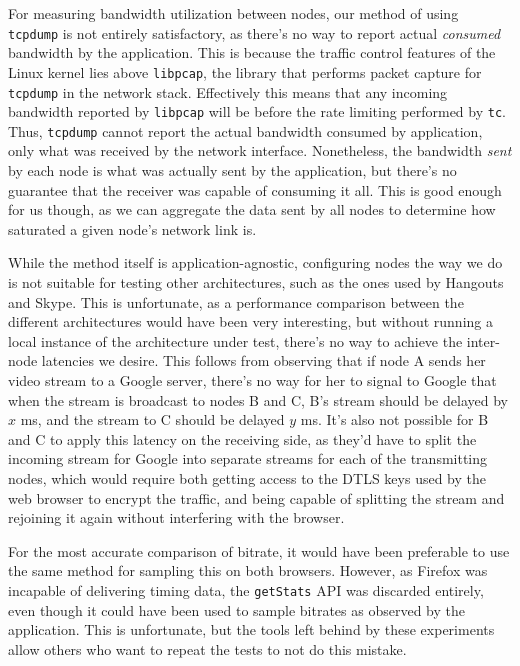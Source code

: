 For measuring bandwidth utilization between nodes, our method of using \texttt{tcpdump} is not entirely satisfactory, as there's no way to report actual \emph{consumed} bandwidth by the application. This is because the traffic control features of the Linux kernel lies above \texttt{libpcap}, the library that performs packet capture for \texttt{tcpdump} in the network stack. Effectively this means that any incoming bandwidth reported by \texttt{libpcap} will be before the rate limiting performed by \texttt{tc}. Thus, \texttt{tcpdump} cannot report the actual bandwidth consumed by application, only what was received by the network interface. Nonetheless, the bandwidth \emph{sent} by each node is what was actually sent by the application, but there's no guarantee that the receiver was capable of consuming it all. This is good enough for us though, as we can aggregate the data sent by all nodes to determine how saturated a given node's network link is.

While the method itself is application-agnostic, configuring nodes the way we do is not suitable for testing other architectures, such as the ones used by Hangouts and Skype. This is unfortunate, as a performance comparison between the different architectures would have been very interesting, but without running a local instance of the architecture under test, there's no way to achieve the inter-node latencies we desire. This follows from observing that if node A sends her video stream to a Google server, there's no way for her to signal to Google that when the stream is broadcast to nodes B and C, B's stream should be delayed by $x$ ms, and the stream to C should be delayed $y$ ms. It's also not possible for B and C to apply this latency on the receiving side, as they'd have to split the incoming stream for Google into separate streams for each of the transmitting nodes, which would require both getting access to the DTLS keys used by the web browser to encrypt the traffic, and being capable of splitting the stream and rejoining it again without interfering with the browser.

For the most accurate comparison of bitrate, it would have been preferable to use the same method for sampling this on both browsers. However, as Firefox was incapable of delivering timing data, the \texttt{getStats} API was discarded entirely, even though it could have been used to sample bitrates as observed by the application. This is unfortunate, but the tools left behind by these experiments allow others who want to repeat the tests to not do this mistake.


